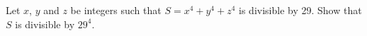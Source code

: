 Let \( x\), \( y\) and \( z\) be integers such that \( S = x^{4}+y^{4}+z^{4}\) is divisible by 29. Show that \( S\) is divisible by \( 29^{4}\).